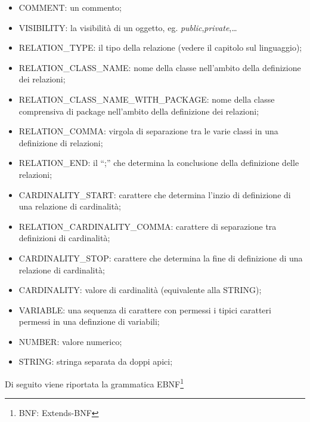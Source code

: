 \begin{itemize}
\item COMMENT: un commento;
\item VISIBILITY: la visibilità di un oggetto, eg. \emph{public},\emph{private},\ldots 
\item RELATION{\_}TYPE: il tipo della relazione (vedere il capitolo sul
linguaggio); 
\item RELATION{\_}CLASS{\_}NAME: nome della classe nell'ambito della definizione
dei relazioni;
\item RELATION{\_}CLASS{\_}NAME{\_}WITH{\_}PACKAGE: nome della classe
comprensiva di package nell'ambito della definizione dei relazioni;
\item RELATION{\_}COMMA: virgola di separazione tra le varie classi in una
definizione di relazioni;
\item RELATION{\_}END: il ``;'' che determina la conclusione della definizione
delle relazioni;
\item CARDINALITY{\_}START: carattere che determina l'inzio di definizione di
una relazione di cardinalità;
\item RELATION{\_}CARDINALITY{\_}COMMA: carattere di separazione tra definizioni
di cardinalità; 
\item CARDINALITY{\_}STOP: carattere che determina la fine di definizione di
una relazione di cardinalità;
\item CARDINALITY: valore di cardinalità (equivalente alla STRING);
\item VARIABLE: una sequenza di carattere con permessi i tipici caratteri
permessi in una definzione di variabili;
\item NUMBER: valore numerico; 
\item STRING: stringa separata da doppi apici;

\end{itemize}

Di seguito viene riportata la grammatica EBNF\footnote{BNF: Extends-BNF}